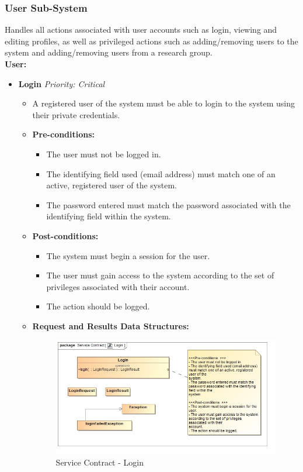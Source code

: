 \documentclass{article}
\begin{document}
			\subsubsection{User Sub-System}\label{subsubsec:user}
				Handles all actions associated with user accounts such as login, viewing and editing profiles, as well as privileged actions such as adding/removing users to the system and adding/removing users from a research group.\\
				[3mm]
				\textbf{User:}
				\begin{itemize}
					\item \textbf{Login} \hfill \textit{Priority: Critical}
					\begin{itemize}
						\item A registered user of the system must be able to login to the system using their private credentials.
						\item \textbf{Pre-conditions:}
						\begin{itemize}
							\item The user must not be logged in.
							\item The identifying field used (email address) must match one of an active, registered user of the system.
							\item The password entered must match the password associated with the identifying field within the system.
						\end{itemize}
						\item \textbf{Post-conditions:}
						\begin{itemize}
							\item The system must begin a session for the user.
							\item The user must gain access to the system according to the set of privileges associated with their account.		
							\item The action should be logged.
						\end{itemize}
						\item \textbf{Request and Results Data Structures:}
						\begin{figure}[H]
							\includegraphics[width=\linewidth]{../Diagrams/ServiceContracts/User subsystem/Login.jpg}
							\caption{Service Contract - Login}
						\end{figure}
					\end{itemize}
					

\end{itemize}
\end{document}
